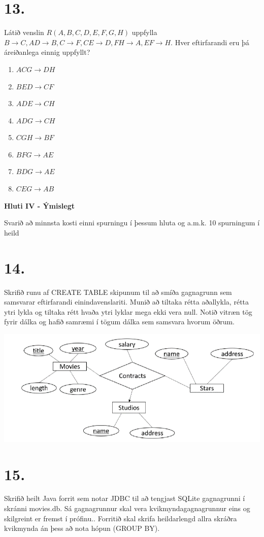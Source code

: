 \documentclass{article}
\newcommand{\bo}[1]{\textbf{#1}}
\newcommand{\enum}{\begin{enumerate}[label = \alph*.]}
\begin{document}
\newpage


\section{13.}
Látið venslin $R(A, B, C, D, E, F, G, H)$ uppfylla $B \rightarrow C, AD \rightarrow B, C \rightarrow
F, CE \rightarrow D, FH \rightarrow A, EF \rightarrow H$.
Hver eftirfarandi eru þá áreiðanlega einnig uppfyllt?

\enum
\item $ACG \rightarrow DH$
\item $BED \rightarrow CF$
\item $ADE \rightarrow CH$
\item $ADG \rightarrow CH$
\item $CGH \rightarrow BF$
\item $BFG \rightarrow AE$
\item $BDG \rightarrow AE$
\item $CEG \rightarrow AB$
\end{enumerate}

\newpage

\begin{center}
    \bo{Hluti IV - Ýmislegt}

    Svarið að minnsta kosti einni spurningu í þessum hluta  og
    a.m.k. 10 spurningum í heild
\end{center}

\section{14.}
Skrifið runu af CREATE TABLE skipunum til að smíða gagnagrunn
sem samsvarar eftirfarandi einindavenslariti. Munið að tiltaka rétta
aðallykla, rétta ytri lykla og tiltaka rétt hvaða ytri lyklar mega ekki
vera null. Notið vitræn tög fyrir dálka og hafið samræmi í tögum
dálka sem samsvara hvorum öðrum.

\begin{center}
    \includegraphics[scale = 0.8]{myndir/mynd1.png}
\end{center}

\vspace{1cm}

\section{15.}
Skrifið heilt Java forrit sem notar JDBC til að tengjast SQLite
gagnagrunni í skránni movies.db. Sá gagnagrunnur skal vera
kvikmyndagagnagrunnur eins og skilgreint er fremst í prófinu..
Forritið skal skrifa heildarlengd allra skráðra kvikmynda án þess að
nota hópun (GROUP BY).
\end{document}
